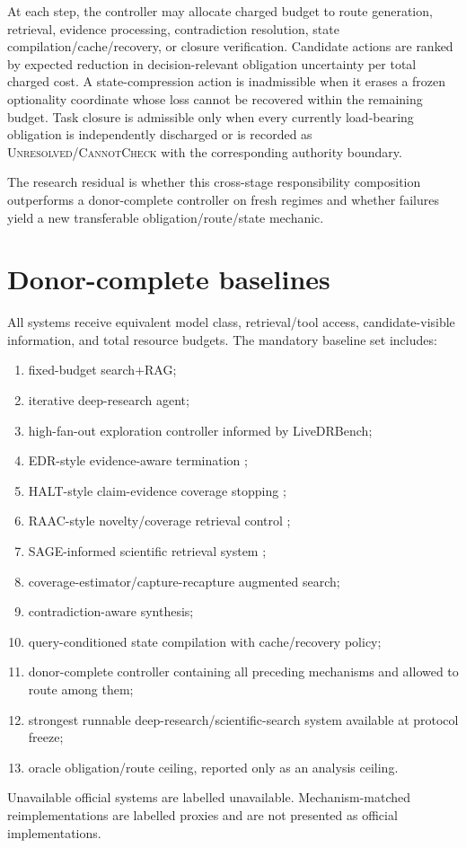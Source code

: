 \documentclass[11pt]{article}
\begin{document}
At each step, the controller may allocate charged budget to route generation, retrieval, evidence processing, contradiction resolution, state compilation/cache/recovery, or closure verification. Candidate actions are ranked by expected reduction in decision-relevant obligation uncertainty per total charged cost. A state-compression action is inadmissible when it erases a frozen optionality coordinate whose loss cannot be recovered within the remaining budget. Task closure is admissible only when every currently load-bearing obligation is independently discharged or is recorded as \textsc{Unresolved}/\textsc{CannotCheck} with the corresponding authority boundary.

The research residual is whether this cross-stage responsibility composition outperforms a donor-complete controller on fresh regimes and whether failures yield a new transferable obligation/route/state mechanic.

\section{Donor-complete baselines}
All systems receive equivalent model class, retrieval/tool access, candidate-visible information, and total resource budgets. The mandatory baseline set includes:
\begin{enumerate}
    \item fixed-budget search+RAG;
    \item iterative deep-research agent;
    \item high-fan-out exploration controller informed by LiveDRBench;
    \item EDR-style evidence-aware termination \cite{dontstopearly2026};
    \item HALT-style claim-evidence coverage stopping \cite{halt2026};
    \item RAAC-style novelty/coverage retrieval control \cite{raac2026};
    \item SAGE-informed scientific retrieval system \cite{sage2026};
    \item coverage-estimator/capture-recapture augmented search;
    \item contradiction-aware synthesis;
    \item query-conditioned state compilation with cache/recovery policy;
    \item donor-complete controller containing all preceding mechanisms and allowed to route among them;
    \item strongest runnable deep-research/scientific-search system available at protocol freeze;
    \item oracle obligation/route ceiling, reported only as an analysis ceiling.
\end{enumerate}
Unavailable official systems are labelled unavailable. Mechanism-matched reimplementations are labelled proxies and are not presented as official implementations.
\end{document}
